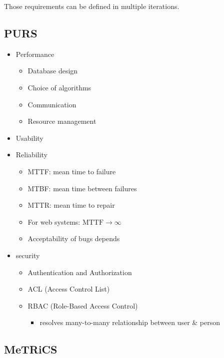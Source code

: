 \documentclass[a4paper]{report}
\begin{document}
Those requirements can be defined in multiple iterations.

\subsection{PURS}

\begin{itemize}
  \item Performance
    \begin{itemize}
      \item Database design
      \item Choice of algorithms
      \item Communication
      \item Resource management
    \end{itemize}

  \item Usability
  \item Reliability
    \begin{itemize}
      \item MTTF: mean time to failure
      \item MTBF: mean time between failures
      \item MTTR: mean time to repair
      \item For web systems: $\text{MTTF} \to\infty$
      \item Acceptability of bugs depends
    \end{itemize}

  \item security
    \begin{itemize}
      \item Authentication and Authorization
      \item ACL (Access Control List)
      \item RBAC (Role-Based Access Control)
        \begin{itemize}
          \item resolves many-to-many relationship between user \& person
        \end{itemize}
    \end{itemize}
\end{itemize}

\subsection{MeTRiCS}
\end{document}
